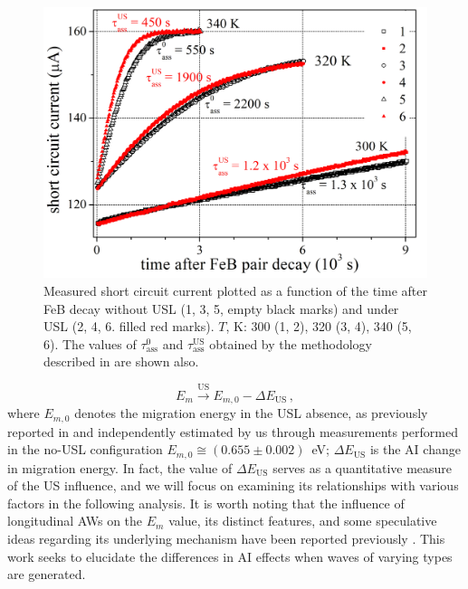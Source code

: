\documentclass{ttp}
\begin{document}

\begin{figure}
	\centering
     \includegraphics[width=\linewidth]{Fig1.png}
	  \caption{Measured short circuit current plotted as a function of the time after FeB decay
      without USL (1, 3, 5, empty black marks) and under USL (2, 4, 6. filled red marks).
      $T$, K: 300 (1, 2), 320 (3, 4), 340 (5, 6).
      The values of $\tau_\mathrm{ass}^0$ and $\tau_\mathrm{ass}^\mathrm{US}$ obtained
      by the methodology described in \cite{Olikh2021JAP,Olikh2022:JMatSci} are shown also.
}\label{fig1}
\end{figure}

\begin{equation}
\label{eqEmUs}
E_m \xrightarrow{\mathrm{US}} E_{m,0}-\Delta E_\mathrm{US}\,,
\end{equation}
where
$E_{m,0}$ denotes the migration energy in the USL absence,
as previously reported in \cite{FeBAssJAP2014} 
and independently estimated by us through measurements performed in the no-USL configuration
$E_{m,0}\cong(0.655\pm0.002)$~eV;
$\Delta E_\mathrm{US}$ is the AI change in migration energy.
In fact, the value of $\Delta E_\mathrm{US}$ serves as a quantitative measure 
of the US influence, and we will focus on examining its relationships with various factors in the following analysis.
It is worth noting that the influence of longitudinal AWs on the $E_m$ value, 
its distinct features, and some speculative ideas regarding its underlying mechanism have been reported previously \cite{Olikh2021JAP,Olikh2022:JMatSci}.
This work seeks to elucidate the differences in AI effects when waves of varying types are generated.
\end{document}
